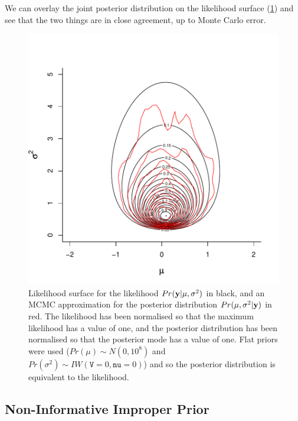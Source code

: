 \documentclass{article}
\begin{document}
We can overlay the joint posterior distribution on the likelihood surface (\ref{Psurface.flat-fig}) and see that the two things are in close agreement, up to Monte Carlo error.
 

\iftalk
\else
\fi

\begin{figure}[!h]
\begin{center}
\includegraphics{Lecture1-065}
\end{center}
\caption{Likelihood surface for the likelihood $Pr({\bf y}|\mu, \sigma^{2})$ in black, and an MCMC approximation for the posterior distribution $Pr(\mu, \sigma^{2} | {\bf y})$ in red.  The likelihood has been normalised so that the maximum likelihood has a value of one, and the posterior distribution has been normalised so that the posterior mode has a value of one. Flat priors were used ($Pr(\mu)\sim N(0, 10^8)$ and  $Pr(\sigma^{2})\sim IW(\texttt{V}=0, \texttt{nu}=0)$) and so the posterior distribution is equivalent to the likelihood.}
\label{Psurface.flat-fig}
\end{figure}

\iftalk
\else
\fi
\newpage

\subsection{Non-Informative Improper Prior}
\end{document}
